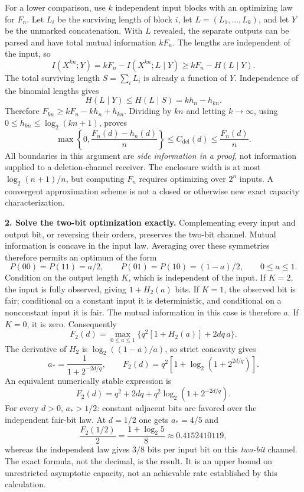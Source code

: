 \documentclass[11pt,a4paper]{article}
\numberwithin{equation}{section}
\begin{document}
For a lower comparison, use $k$ independent input blocks with an
optimizing law for $F_n$. Let $L_i$ be the surviving length of block $i$,
let $L=(L_1,\ldots,L_k)$, and let $Y$ be the unmarked concatenation.
With $L$ revealed, the separate outputs can be parsed and have total
mutual information $kF_n$. The lengths are independent of the input, so
\[
 I(X^{kn};Y)=kF_n-I(X^{kn};L\mid Y)
          \ge kF_n-H(L\mid Y).
\]
The total surviving length $S=\sum_iL_i$ is already a function of $Y$.
Independence of the binomial lengths gives
\[
 H(L\mid Y)\le H(L\mid S)=kh_n-h_{kn}.
\]
Therefore $F_{kn}\ge kF_n-kh_n+h_{kn}$. Dividing by $kn$ and letting
$k\to\infty$, using $0\le h_{kn}\le\log_2(kn+1)$, proves
\begin{equation}\label{statement:enclosure}
 \max\left\{0,\frac{F_n(d)-h_n(d)}n\right\}
 \le C_{\mathrm{del}}(d)\le\frac{F_n(d)}n.
\end{equation}
All boundaries in this argument are \emph{side information in a proof},
not information supplied to a deletion-channel receiver.
The enclosure width is at most $\log_2(n+1)/n$, but computing $F_n$
requires optimizing over $2^n$ inputs. A convergent approximation scheme
is not a closed or otherwise new exact capacity characterization.

\textbf{2. Solve the two-bit optimization exactly.}
Complementing every input and output bit, or reversing their orders,
preserves the two-bit channel. Mutual information is concave in the
input law. Averaging over these symmetries therefore permits an optimum
of the form
\[
 P(00)=P(11)=a/2,\qquad P(01)=P(10)=(1-a)/2,
 \qquad0\le a\le1.
\]
Condition on the output length $K$, which is independent of the input.
If $K=2$, the input is fully observed, giving $1+H_2(a)$ bits. If
$K=1$, the observed bit is fair; conditional on a constant input it is
deterministic, and conditional on a nonconstant input it is fair. The
mutual information in this case is therefore $a$. If $K=0$, it is zero.
Consequently
\begin{equation}\label{statement:twobit}
 F_2(d)=\max_{0\le a\le1}
 \{q^2[1+H_2(a)]+2dq\,a\}.
\end{equation}
The derivative of $H_2$ is $\log_2((1-a)/a)$, so strict concavity gives
\[
 a_* =\frac1{1+2^{-2d/q}},\qquad
 F_2(d)=q^2\left[1+\log_2(1+2^{2d/q})\right].
\]
An equivalent numerically stable expression is
\begin{equation}\label{statement:closed}
 F_2(d)=q^2+2dq+q^2\log_2(1+2^{-2d/q}).
\end{equation}
For every $d>0$, $a_*>1/2$: constant adjacent bits are favored over the
independent fair-bit law. At $d=1/2$ one gets $a_*=4/5$ and
\[
 \frac{F_2(1/2)}2=\frac{1+\log_2 5}{8}
                  \approx0.4152410119,
\]
whereas the independent law gives $3/8$ bits per input bit on this
\emph{two-bit} channel. The exact formula, not the decimal, is the result.
It is an upper bound on unrestricted asymptotic capacity, not an
achievable rate established by this calculation.
\end{document}
